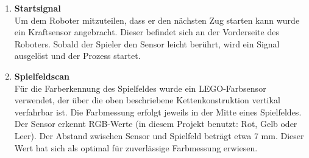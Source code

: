 \begin{enumerate}
	\item \textbf{Startsignal}\\
	Um dem Roboter mitzuteilen, dass er den nächsten Zug starten kann wurde ein Kraftsensor angebracht. Dieser befindet sich an der Vorderseite des Roboters. Sobald der Spieler den Sensor leicht berührt, wird ein Signal ausgelöst und der Prozess startet. 
	\item \textbf{Spielfeldscan }\\
	 Für die Farberkennung des Spielfeldes wurde ein LEGO-Farbsensor verwendet, der über die oben beschriebene Kettenkonstruktion vertikal verfahrbar ist. Die Farbmessung erfolgt jeweils in der Mitte eines Spielfeldes. Der Sensor erkennt RGB-Werte (in diesem Projekt benutzt: Rot, Gelb oder Leer). Der Abstand zwischen Sensor und Spielfeld beträgt etwa 7 mm. Dieser Wert hat sich als optimal für zuverlässige Farbmessung erwiesen.
\end{enumerate}

